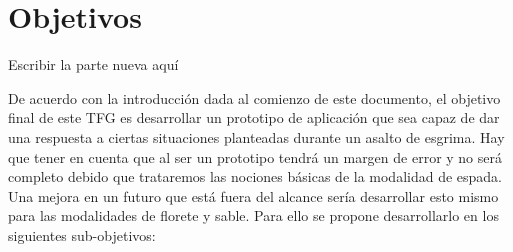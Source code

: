 \documentclass[11pt,a4paper,twoside,final]{article}
\begin{document}



\newpage

\section{Objetivos}

Escribir la parte nueva aquí 







\iffalse





De acuerdo con la introducción dada al comienzo de este documento, el objetivo final de este
TFG es desarrollar un prototipo de aplicación que sea capaz de dar una respuesta a ciertas situaciones
planteadas durante un asalto de esgrima. Hay que tener en cuenta que al ser un prototipo tendrá un margen
de error y no será completo debido que trataremos las nociones básicas de la modalidad de espada.
 Una mejora en un futuro que está fuera del alcance sería desarrollar esto mismo para las modalidades
 de florete y sable. Para ello se propone desarrollarlo en los siguientes sub-objetivos:
\end{document}
